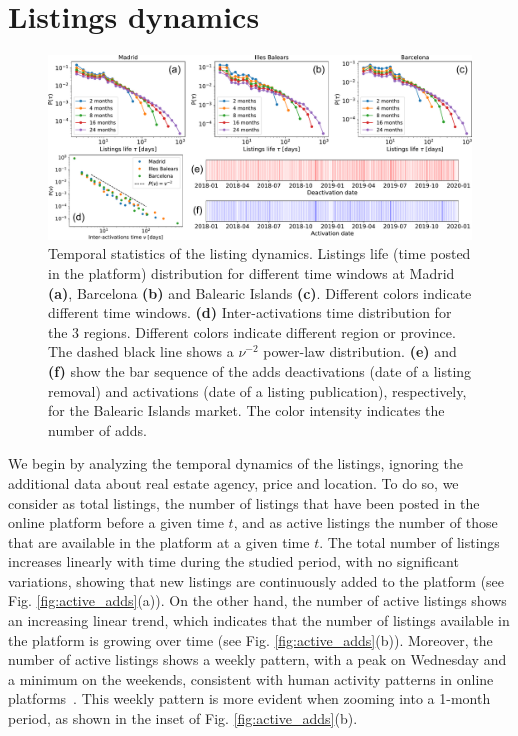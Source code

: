 \section{Listings dynamics}

\begin{figure}
    \centering
    \includegraphics[width =\textwidth]{Figs/Idealista_dynamics/panel_time.pdf}
	\caption[Temporal statistics of the listing dynamics.]{ \label{fig:panel_time} Temporal statistics of the listing dynamics. Listings life (time posted in the platform) distribution for different time windows at Madrid \textbf{(a)}, Barcelona \textbf{(b)} and Balearic Islands \textbf{(c)}. Different colors indicate different time windows. \textbf{(d)} Inter-activations time distribution for the 3 regions. Different colors indicate different region or province. The dashed black line shows a $\nu^{-2}$ power-law distribution. \textbf{(e)} and \textbf{(f)} show the bar sequence of the adds deactivations (date of a listing removal) and activations (date of a listing publication), respectively, for the Balearic Islands market. The color intensity indicates the number of adds.}
\end{figure}

We begin by analyzing the temporal dynamics of the listings, ignoring the additional data about real estate agency, price and location. To do so, we consider as total listings, the number of listings that have been posted in the online platform before a given time $t$, and as active listings the number of those that are available in the platform at a given time $t$. The total number of listings increases linearly with time during the studied period, with no significant variations, showing that new listings are continuously added to the platform (see Fig. \ref{fig:active_adds}(a)). On the other hand, the number of active listings shows an increasing linear trend, which indicates that the number of listings available in the platform is growing over time (see Fig. \ref{fig:active_adds}(b)). Moreover, the number of active listings shows a weekly pattern, with a peak on Wednesday and a minimum on the weekends, consistent with human activity patterns in online platforms~\cite{goncalves-2008}. This weekly pattern is more evident when zooming into a 1-month period, as shown in the inset of Fig. \ref{fig:active_adds}(b).

